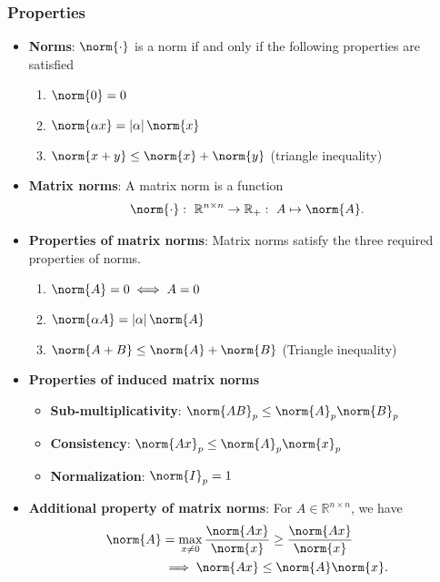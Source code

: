 \documentclass{report}
\begin{document}
    \subsubsection{Properties}
    \begin{itemize}
        \item \textbf{Norms}: $\norm{\cdot}$ is a norm if and only if the following properties are satisfied
            \begin{enumerate}
                \item $\norm{0} = 0 $ 
                \item $ \norm{\alpha x} = \left\lvert \alpha \right\rvert \norm{x}$
                \item $\norm{x+y} \leq \norm{x} + \norm{y} $ (triangle inequality)
            \end{enumerate}
        \item \textbf{Matrix norms}: A matrix norm is a function 
            \begin{align*}
                \norm{\cdot }:\ \mathbb{R}^{n\times n} \to \mathbb{R}_{+}:\ A \mapsto  \norm{A}
            .\end{align*}
        \item \textbf{Properties of matrix norms}: Matrix norms satisfy the three required properties of norms.
            \begin{enumerate}
                \item $\norm{A} = 0 \iff A = 0 $
                \item $\norm{\alpha A} = \left\lvert \alpha \right\rvert \norm{A} $
                \item $\norm{A + B} \leq \norm{A} + \norm{B} $ (Triangle inequality)
            \end{enumerate}

        \item \textbf{Properties of induced matrix norms}
            \begin{itemize}
                \item \textbf{Sub-multiplicativity}: $\norm{AB}_{p} \leq \norm{A}_{p}\norm{B}_{p} $
                \item \textbf{Consistency}: $\norm{Ax}_{p} \leq \norm{A}_{p}\norm{x}_{p} $
                \item \textbf{Normalization}: $\norm{I}_{p} = 1 $
            \end{itemize}
        \item \textbf{Additional property of matrix norms}: For $A \in \mathbb{R}^{n\times n}$, we have
            \begin{align*}
                \norm{A} &= \max_{x\ne 0} \frac{\norm{Ax}}{\norm{x}} \geq \frac{\norm{Ax}}{\norm{x}} \\
                         &\implies \norm{Ax} \leq \norm{A}\norm{x}
            .\end{align*}


    \end{itemize}
\end{document}
